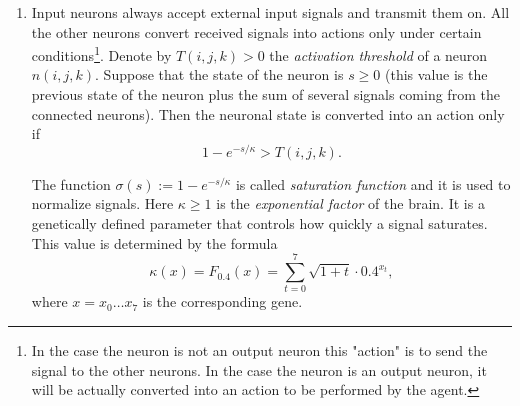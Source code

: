 \documentclass[12pt,a4paper]{article}
\begin{document}
\begin{enumerate}
	For a connection created by \emph{developmental rescue}, the corresponding initial weight is instead
	\begin{equation}
		w_{i,j,k}^{u,v,w}=\max\!\left\{\left(1-A_{i,j,k}(x)^2\right)H_{i,j,k}(u,v,w,x)^2,\,0.1\right\}.
		\label{rescue_synaptic_weight}
	\end{equation}

	The source-dependent attenuation factor $1-A_{i,j,k}(x)^2$ is the same in both expressions. During ordinary construction, positive values of $H$ determine eligibility and ranking; during rescue, neighboring candidates are ranked by $H^2>0$, regardless of the sign of $H$. The attenuation and the minimum initial weight of $0.1$ are applied only after selecting the connection, so neither affects candidate ranking or eligibility. Thus, every connection created during initial development has weight in $[0.1,1]$, including cases where finite-precision evaluation of $A$ yields $|A|=1$ and the attenuation vanishes. This floor concerns the initial weight only, subsequent synaptic dynamics may weaken or remove connections. For connections originating from input neurons, the input-specific minimum weight defined below is also enforced using the \emph{input influence gene}, so their final initial weight is the maximum of the value in Equation~\ref{initial_synaptic_weight} or~\ref{rescue_synaptic_weight} (as appropriate) and $1/(1+\psi(x))$.

	\item Input neurons always accept external input signals and transmit them on. All the other neurons convert received signals into actions only under certain conditions\footnote{In the case the neuron is not an output neuron this "action" is to send the signal to the other neurons. In the case the neuron is an output neuron, it will be actually converted into an action to be performed by the agent.}. Denote by $T(i, j, k) > 0$ the \emph{activation threshold} of a neuron $n(i, j, k)$. Suppose that the state of the neuron is $s \geq 0$ (this value is the previous state of the neuron plus the sum of several signals coming from the connected neurons). Then the neuronal state is converted into an action only if
	$$1 - e^{-s/\kappa} > T(i, j, k).$$
	
	The function $\sigma(s) := 1 - e^{-s/\kappa}$ is called \emph{saturation function} and it is used to normalize signals. Here $\kappa \geq 1$ is the \emph{exponential factor} of the brain. It is a genetically defined parameter that controls how quickly a signal saturates. This value is determined by the formula
	$$\kappa(x) = F_{0.4}(x) = \sum_{t=0}^7 \sqrt{1 + t} \cdot 0.4^{x_t},$$
where  $x = x_0 \ldots x_7$ is the corresponding gene.


\end{enumerate}
\end{document}
